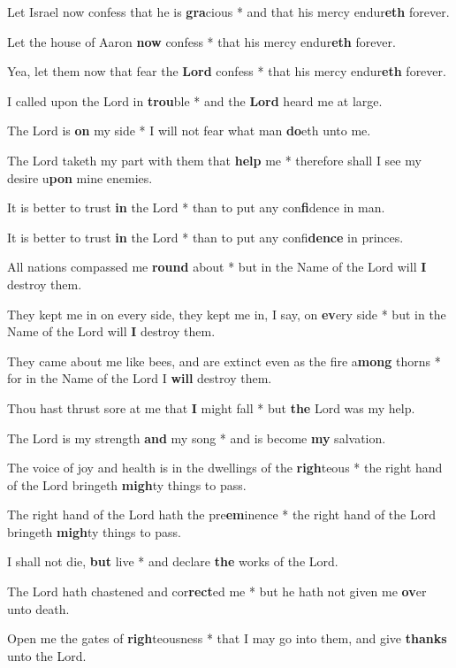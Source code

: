 \begin{multicols}{2}
	Let Israel now confess that he is \textbf{gra}cious * and that his mercy endur\textbf{eth} forever.
	
	Let the house of Aaron \textbf{now} confess * that his mercy endur\textbf{eth} forever.
	
	Yea, let them now that fear the \textbf{Lord} confess * that his mercy endur\textbf{eth} forever.
	
	I called upon the Lord in \textbf{trou}ble * and the \textbf{Lord} heard me at large.
	
	The Lord is \textbf{on} my side * I will not fear what man \textbf{do}eth unto me.
	
	The Lord taketh my part with them that \textbf{help} me * therefore shall I see my desire u\textbf{pon} mine enemies.
	
	It is better to trust \textbf{in} the Lord * than to put any con\textbf{fi}dence in man.
	
	It is better to trust \textbf{in} the Lord * than to put any confi\textbf{dence} in princes.
	
	All nations compassed me \textbf{round} about * but in the Name of the Lord will \textbf{I} destroy them.
	
	They kept me in on every side, they kept me in, I say, on \textbf{ev}ery side * but in the Name of the Lord will \textbf{I} destroy them.
	
	They came about me like bees, and are extinct even as the fire a\textbf{mong} thorns * for in the Name of the Lord I \textbf{will} destroy them.
	
	Thou hast thrust sore at me that \textbf{I} might fall * but \textbf{the} Lord was my help.
	
	The Lord is my strength \textbf{and} my song * and is become \textbf{my} salvation.
	
	The voice of joy and health is in the dwellings of the \textbf{righ}teous * the right hand of the Lord bringeth \textbf{migh}ty things to pass.
	
	The right hand of the Lord hath the pre\textbf{em}inence * the right hand of the Lord bringeth \textbf{migh}ty things to pass.
	
	I shall not die, \textbf{but} live * and declare \textbf{the} works of the Lord.
	
	The Lord hath chastened and cor\textbf{rect}ed me * but he hath not given me \textbf{ov}er unto death.
	
	Open me the gates of \textbf{righ}teousness * that I may go into them, and give \textbf{thanks} unto the Lord.
	

\end{multicols}
